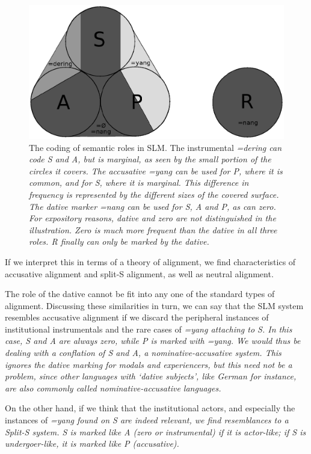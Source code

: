 \begin{figure}
 \centering
 \includegraphics[height=.3\textheight]{pics/sap-slm.eps}
 \caption[Coding of semantic roles in SLM]{The coding of semantic roles in SLM. The instrumental \em =dering \em can code S and A, but is marginal, as seen by the small portion of the circles it covers. The accusative \em =yang \em can be used for P, where it is common, and for S, where it is marginal. This difference in frequency is represented by the different sizes of the covered surface. The dative marker \em =nang \em can be used for S, A and P, as can zero. For expository reasons, dative and zero are not distinguished in the illustration. Zero is much more frequent than the dative in all three roles. R finally can only be marked by the dative.}
 \label{fig:argstr}
\end{figure}


If we interpret this in terms of a theory of alignment, we find characteristics of accusative alignment and split-S alignment, as well as neutral alignment.

The role of the dative cannot be fit into any one of the standard types of alignment. Discussing these similarities in turn, we can say that the SLM system resembles accusative alignment if we discard the peripheral instances of institutional instrumentals and the rare cases of \em =yang \em attaching to S. In this case, S and A are always zero, while P is marked with \em =yang\em. We would  thus be dealing with a conflation of S and A, a nominative-accusative system. This ignores the dative marking for modals and experiencers, but this need not be a problem, since other languages with `dative subjects', like German for instance, are also commonly called nominative-accusative languages.

On the other hand, if we think that the institutional actors, and especially the instances of \em =yang \em found on S are indeed relevant, we find resemblances to a Split-S system. S is marked like A (zero or instrumental) if it is actor-like; if S is undergoer-like, it is marked like P (accusative).

